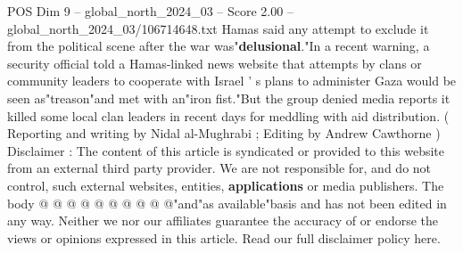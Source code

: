 \begin{textsample}{POS Dim 9 – global\_north\_2024\_03 – Score 2.00 – global\_north\_2024\_03/106714648.txt}
Hamas said any attempt to exclude it from the political scene after the war was"\textbf{delusional}."In a recent warning, a security official told a Hamas-linked news website that attempts by clans or community leaders to cooperate with Israel ' s plans to administer Gaza would be seen as"treason"and met with an"iron fist."But the group denied media reports it killed some local clan leaders in recent days for meddling with aid distribution. ( Reporting and writing by Nidal al-Mughrabi ; Editing by Andrew Cawthorne ) Disclaimer : The content of this article is syndicated or provided to this website from an external third party provider.
We are not responsible for, and do not control, such external websites, entities, \textbf{applications} or media publishers.
The body @ @ @ @ @ @ @ @ @ @"and"as available"basis and has not been edited in any way.
Neither we nor our affiliates guarantee the accuracy of or endorse the views or opinions expressed in this article.
Read our full disclaimer policy here.

\end{textsample}
